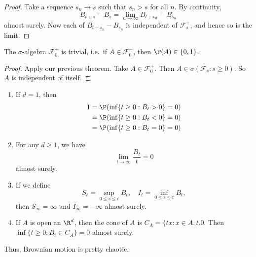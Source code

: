 \documentclass[a4paper]{article}
\begin{document}
\begin{proof}
  Take a sequence $s_n \to s$ such that $s_n > s$ for all $n$. By continuity,
  \[
    B_{t + s} - B_s = \lim_{n \to \infty} B_{t + s_n} - B_{s_n}
  \]
  almost surely. Now each of $B_{t + s_n} - B_{s_n}$ is independent of $\mathcal{F}_s^+$, and hence so is the limit.
%  
\end{proof}

\begin{thm}
  The $\sigma$-algebra $\mathcal{F}^+_0$ is trivial, i.e.\ if $A \in \mathcal{F}_0^+$, then $\P(A) \in \{0, 1\}$.
\end{thm}

\begin{proof}
  Apply our previous theorem. Take $A \in \mathcal{F}_0^+$. Then $A \in \sigma (\mathcal{F}_s: s \geq 0)$. So $A$ is independent of itself.
\end{proof}

\begin{prop}\leavevmode
  \begin{enumerate}
    \item If $d = 1$, then
      \begin{align*}
        1 &= \P(\inf \{t \geq 0: B_t > 0\} = 0) \\
        &= \P (\inf \{t \geq 0: B_t < 0\} = 0) \\
        &= \P(\inf \{t \geq 0: B_t = 0\} = 0)
      \end{align*}
    \item For any $d \geq 1$, we have
      \[
        \lim_{t \to \infty} \frac{B_t}{t} = 0
      \]
      almost surely.
    \item If we define
      \[
        S_t = \sup_{0 \leq s \leq t} B_t,\quad I_t = \inf_{0 \leq s \leq t} B_t,
      \]
      then $S_\infty = \infty$ and $I_\infty = -\infty$ almost surely.
    \item If $A$ is open an $\R^d$, then the cone of $A$ is $C_A = \{tx: x \in A, t . 0$. Then $\inf \{t \geq 0: B_t \in C_A\} = 0$ almost surely.
  \end{enumerate}
\end{prop}
Thus, Brownian motion is pretty chaotic.
\end{document}
